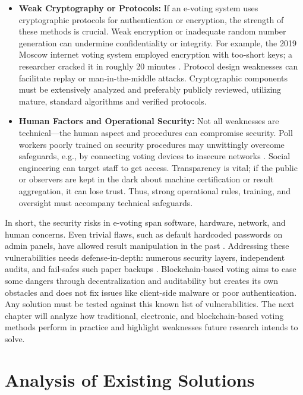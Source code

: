 \documentclass[a4paper,10pt]{report}
\begin{document}
\begin{itemize}
     \item \textbf {Weak Cryptography or Protocols:}  If an e-voting system uses cryptographic protocols for authentication or encryption, the strength of these methods is crucial.  Weak encryption or inadequate random number generation can undermine confidentiality or integrity.  For example, the 2019 Moscow internet voting system employed encryption with too-short keys; a researcher cracked it in roughly 20 minutes \cite{moscow2019crypto}.  Protocol design weaknesses can facilitate replay or man-in-the-middle attacks.  Cryptographic components must be extensively analyzed and preferably publicly reviewed, utilizing mature, standard algorithms and verified protocols.
    
     \item \textbf {Human Factors and Operational Security:}  Not all weaknesses are technical—the human aspect and procedures can compromise security.  Poll workers poorly trained on security procedures may unwittingly overcome safeguards, e.g., by connecting voting devices to insecure networks \cite{estonia2017report}.  Social engineering can target staff to get access.  Transparency is vital; if the public or observers are kept in the dark about machine certification or result aggregation, it can lose trust.  Thus, strong operational rules, training, and oversight must accompany technical safeguards.
\end{itemize}

In short, the security risks in e-voting span software, hardware, network, and human concerns.   Even trivial flaws, such as default hardcoded passwords on admin panels, have allowed result manipulation in the past \cite{neumann1996computer}.   Addressing these vulnerabilities needs defense-in-depth: numerous security layers, independent audits, and fail-safes such paper backups \cite{neumann1996computer}.   Blockchain-based voting aims to ease some dangers through decentralization and auditability but creates its own obstacles and does not fix issues like client-side malware or poor authentication.   Any solution must be tested against this known list of vulnerabilities.   The next chapter will analyze how traditional, electronic, and blockchain-based voting methods perform in practice and highlight weaknesses future research intends to solve.

\chapter{Analysis of Existing Solutions}
\end{document}
